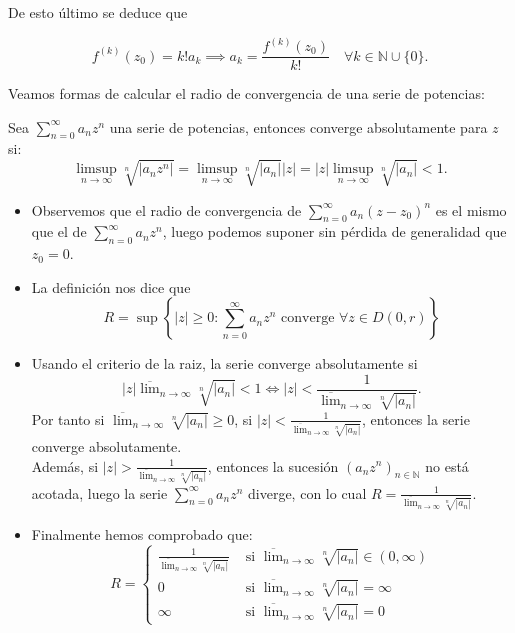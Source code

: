 De esto último se deduce que 

\[
f^{(k)}(z_0) = k! a_k \implies a_k = \frac{f^{(k)}(z_0)}{k!} \quad \forall k \in \mathbb{N} \cup \{0\}.
\]

Veamos formas de calcular el radio de convergencia de una serie de potencias:

\begin{proposición}
    Sea $\sum_{n=0}^{\infty} a_n z^n$ una serie de potencias, entonces converge absolutamente para $z$ si:
    \[
        \limsup_{n\to\infty} \sqrt[n]{|a_n z^n|} = \limsup_{n\to\infty} \sqrt[n]{|a_n|} |z| = |z| \limsup_{n\to\infty} \sqrt[n]{|a_n|} < 1.
    \]
\end{proposición}

\begin{itemize}
    \item Observemos que el radio de convergencia de $\sum_{n=0}^{\infty} a_n (z - z_0)^n$ es el mismo que el de $\sum_{n=0}^{\infty} a_n z^n$, luego podemos suponer sin pérdida de generalidad que $z_0 = 0$.
    \item La definición nos dice que
    \[
        R = \sup\left\{ |z| \geq 0 : \sum_{n=0}^{\infty} a_n z^n \text{ converge } \forall z \in D(0, r) \right\}
    \]
    \item Usando el criterio de la raiz, la serie converge absolutamente si
    \[
        |z| \overline{\lim}_{n\to\infty} \sqrt[n]{|a_n|} < 1 \iff |z| < \frac{1}{\overline{\lim}_{n\to\infty} \sqrt[n]{|a_n|}}.
    \]
    Por tanto si $\overline{\lim}_{n\to\infty} \sqrt[n]{|a_n|} \geq 0$, si $|z| < \frac{1}{\overline{\lim}_{n\to\infty} \sqrt[n]{|a_n|}}$, entonces la serie converge absolutamente.\\
    Además, si $|z| > \frac{1}{\overline{\lim}_{n\to\infty} \sqrt[n]{|a_n|}}$, entonces la sucesión $(a_n z^n)_{n\in\mathbb{N}}$ no está acotada, luego la serie $\sum_{n=0}^{\infty} a_n z^n$ diverge, con lo cual $R = \frac{1}{\overline{\lim}_{n\to\infty} \sqrt[n]{|a_n|}}$.
    \item Finalmente hemos comprobado que:
    \[
        R = 
            \begin{cases}
                \frac{1}{\overline{\lim}_{n\to\infty} \sqrt[n]{|a_n|}} & \text{ si } \overline{\lim}_{n\to\infty} \sqrt[n]{|a_n|} \in (0, \infty)\\
                0 & \text{ si } \overline{\lim}_{n\to\infty} \sqrt[n]{|a_n|} = \infty\\
                \infty & \text{ si } \overline{\lim}_{n\to\infty} \sqrt[n]{|a_n|} = 0
            \end{cases}
    \]
\end{itemize}
